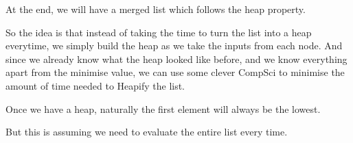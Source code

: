 \documentclass{article}
\theoremstyle{definition}
\begin{document}
At the end, we will have a merged list which follows the heap property.

So the idea is that instead of taking the time to turn the list into a heap everytime, we simply build the heap as we take the inputs from each node. And since we already know what the heap looked like before, and we know everything apart from the minimise value, we can use some clever CompSci to minimise the amount of time needed to Heapify the list.

Once we have a heap, naturally the first element will always be the lowest. 

But this is assuming we need to evaluate the entire list every time. 
\end{document}
